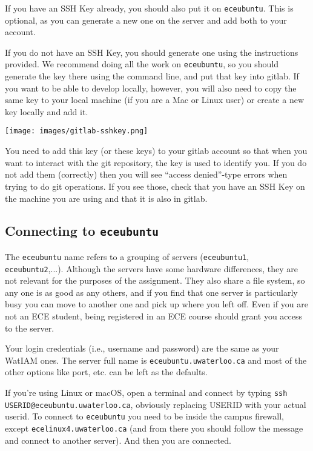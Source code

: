 If you have an SSH Key already, you should also put it on \texttt{eceubuntu}. This is optional, as you can generate a new one on the server and add both to your account.
 
If you do not have an SSH Key, you should generate one using the instructions provided. We recommend doing all the work on \texttt{eceubuntu}, so you should generate the key there using the command line, and put that key into gitlab. If you want to be able to develop locally, however, you will also need to copy the same key to your local machine (if you are a Mac or Linux user) or create a new key locally and add it.

\begin{center}
	\texttt{[image: images/gitlab-sshkey.png]}
\end{center}

You need to add this key (or these keys) to your gitlab account so that when you want to interact with the git repository, the key is used to identify you. If you do not add them (correctly) then you will see ``access denied''-type errors when trying to do git operations. If you see those, check that you have an SSH Key on the machine you are using and that it is also in gitlab.

\subsection*{Connecting to \texttt{eceubuntu}}

The \texttt{eceubuntu} name refers to a grouping of servers (\texttt{eceubuntu1}, \texttt{eceubuntu2},...). Although the servers have some hardware differences, they are not relevant for the purposes of the assignment. They also share a file system, so any one is as good as any others, and if you find that one server is particularly busy you can move to another one and pick up where you left off. Even if you are not an ECE student, being registered in an ECE course should grant you access to the server.

Your login credentials (i.e., username and password) are the same as your WatIAM ones. The server full name is \texttt{eceubuntu.uwaterloo.ca} and most of the other options like port, etc. can be left as the defaults.

If you're using Linux or macOS, open a terminal and connect by typing \texttt{ssh USERID@eceubuntu.uwaterloo.ca}, obviously replacing USERID with your actual userid. To connect to \texttt{eceubuntu} you need to be inside the campus firewall, except \texttt{ecelinux4.uwaterloo.ca} (and from there you should follow the message and connect to another server). And then you are connected.

